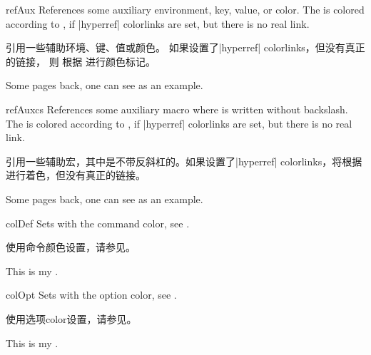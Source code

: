 \begin{docCommand}[doc updated=2020-02-11]{refAux}{}
References some auxiliary environment, key, value, or color.
The  is colored according to ,
if |hyperref| colorlinks are set, but there is no real link.

引用一些辅助环境、键、值或颜色。 如果设置了|hyperref| colorlinks，但没有真正的链接， 则  根据  进行颜色标记。
\begin{dispExample}
Some pages back, one can see  as an example.
\end{dispExample}
\end{docCommand}

\begin{docCommand}[doc updated=2020-02-11]{refAuxcs}{}
References some auxiliary macro  where  is
written without backslash.
The  is colored according to ,
if |hyperref| colorlinks are set, but there is no real link.

引用一些辅助宏，其中是不带反斜杠的。如果设置了|hyperref| colorlinks，将根据进行着色，但没有真正的链接。
\begin{dispExample}
Some pages back, one can see  as an example.
\end{dispExample}
\end{docCommand}


\begin{docCommand}{colDef}{}
Sets  with the command color, see .

使用命令颜色设置，请参见。
\begin{dispExample}
This is my .
\end{dispExample}
\end{docCommand}

\begin{docCommand}{colOpt}{}
Sets  with the option color, see .

使用选项color设置，请参见。
\begin{dispExample}
This is my .
\end{dispExample}
\end{docCommand}


